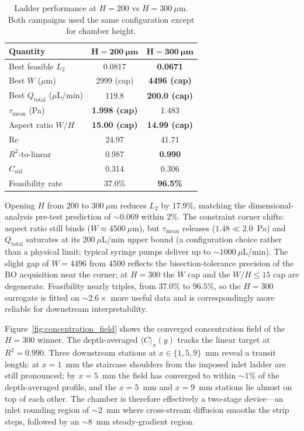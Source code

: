 \documentclass[12pt]{article}
\begin{document}
\begin{table}[H]
\centering
\caption{Ladder performance at $H = 200$ vs $H = 300~\mu$m. Both campaigns used the same configuration except for chamber height.}
\label{tab:h_sweep}
\begin{tabular}{l c c}
\toprule
\textbf{Quantity} & $\boldsymbol{H = 200~\mu\text{m}}$ & $\boldsymbol{H = 300~\mu\text{m}}$ \\
\midrule
Best feasible $L_2$         & 0.0817 & \textbf{0.0671} \\
Best $W$ ($\mu$m)           & 2999 (cap) & \textbf{4496 (cap)} \\
Best $Q_{\text{total}}$ ($\mu$L/min) & 119.8 & \textbf{200.0 (cap)} \\
$\tau_{\text{mean}}$ (Pa)   & \textbf{1.998 (cap)} & 1.483 \\
Aspect ratio $W/H$          & \textbf{15.00 (cap)} & \textbf{14.99 (cap)} \\
Re                          & 24.97 & 41.71 \\
$R^2$-to-linear             & 0.987 & \textbf{0.990} \\
$C_{\text{std}}$            & 0.314 & 0.306 \\
Feasibility rate            & 37.0\% & \textbf{96.5\%} \\
\bottomrule
\end{tabular}
\end{table}

Opening $H$ from $200$ to $300~\mu$m reduces $L_2$ by $17.9\%$, matching the dimensional-analysis pre-test prediction of $\sim 0.069$ within $2\%$. The constraint corner shifts: aspect ratio still binds ($W \approx 4500~\mu$m), but $\tau_{\text{mean}}$ releases ($1.48 \ll 2.0$~Pa) and $Q_{\text{total}}$ saturates at its $200~\mu$L/min upper bound (a configuration choice rather than a physical limit; typical syringe pumps deliver up to $\sim 1000~\mu$L/min). The slight gap of $W = 4496$ from $4500$ reflects the bisection-tolerance precision of the BO acquisition near the corner; at $H = 300$ the $W$ cap and the $W/H \leq 15$ cap are degenerate. Feasibility nearly triples, from $37.0\%$ to $96.5\%$, so the $H = 300$ surrogate is fitted on $\sim 2.6\times$ more useful data and is correspondingly more reliable for downstream interpretability.

Figure~\ref{fig:concentration_field} shows the converged concentration field of the $H = 300$ winner. The depth-averaged $\langle C \rangle_x(y)$ tracks the linear target at $R^2 = 0.990$. Three downstream stations at $x \in \{1, 5, 9\}$~mm reveal a transit length: at $x = 1$~mm the staircase shoulders from the imposed inlet ladder are still pronounced; by $x = 5$~mm the field has converged to within $\sim 1\%$ of the depth-averaged profile, and the $x = 5$~mm and $x = 9$~mm stations lie almost on top of each other. The chamber is therefore effectively a two-stage device---an inlet rounding region of $\sim 2$~mm where cross-stream diffusion smooths the strip steps, followed by an $\sim 8$~mm steady-gradient region.
\end{document}
